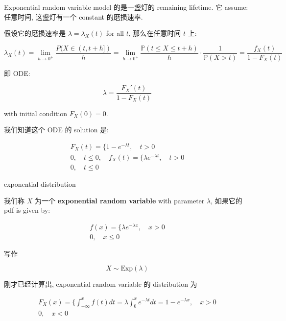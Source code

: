 \documentclass{qlnotes-export}
\begin{document}
Exponential random variable model 的是一盏灯的 remaining lifetime. 它 assume: 任意时间, 这盏灯有一个 constant 的磨损速率.

假设它的磨损速率是 \(\lambda = \lambda_{X}(t)\) for all \(t\), 那么在任意时间 \(t\) 上:

\[\lambda_{X}(t) = \lim\limits_{h\rightarrow 0^{+}}\frac{P(X \in (t,t + h\rbrack)}{h} = \lim\limits_{h\rightarrow 0^{+}}\frac{{\mathbb{P}}(t \leq X \leq t + h)}{h} \cdot \frac{1}{{\mathbb{P}}(X > t)} = \frac{f_{X}(t)}{1 - F_{X}(t)}\]

即 ODE:

\[\lambda = \frac{F_{X}'(t)}{1 - F_{X}(t)}\]

with initial condition \(F_{X}(0) = 0\).

我们知道这个 ODE 的 solution 是:

\[\begin{matrix}
{F_{X}(t) = \{ 1 - e^{- \lambda t},\quad t > 0} \\
{0,\quad t \leq 0,\quad f_{X}(t) = \{\lambda e^{- \lambda t},\quad t > 0} \\
{0,\quad t \leq 0}
\end{matrix}\]

\begin{definition}{exponential distribution}\label{def-02-random-variables-exponential-distribution}

我们称 \(X\) 为一个 \textbf{exponential random variable} with parameter \(\lambda\), 如果它的 pdf is given by:

\[\begin{matrix}
{f(x) = \{\lambda e^{- \lambda x},\quad x > 0} \\
{0,\quad x \leq 0}
\end{matrix}\]

写作

\[X \sim \text{Exp}(\lambda)\]

\end{definition}

刚才已经计算出, exponential random variable 的 distribution 为

\[\begin{matrix}
{F_{X}(x) = \{\int_{- \infty}^{x}f(t) dt = \lambda\int_{0}^{x}e^{- \lambda t} dt = 1 - e^{- \lambda x},\quad x > 0} \\
{0,\quad x < 0}
\end{matrix}\]
\end{document}
